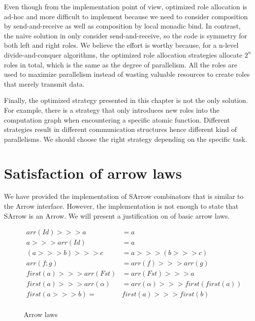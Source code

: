 Even though from the implementation point of view, optimized role allocation is ad-hoc and more difficult to implement because we need to consider composition by send-and-receive as well as composition by local monadic bind. In contrast, the naive solution in  only consider send-and-receive, so the code is symmetry for both left and right roles. We believe the effort is worthy because, for a n-level divide-and-conquer algorithms, the optimized role allocation strategies allocate $2^n$ roles in total, which is the same as the degree of parallelism. All the roles are used to maximize parallelism instead of wasting valuable resources to create roles that merely transmit data.

Finally, the optimized strategy presented in this chapter is not the only solution. For example, there is a strategy that only introduces new roles into the computation graph when encountering a specific atomic function. Different strategies result in different communication structures hence different kind of parallelisms. We should choose the right strategy depending on the specific task.
\section{Satisfaction of arrow laws}
We have provided the implementation of SArrow combinators that is similar to the Arrow interface. However, the implementation is not enough to state that SArrow is an Arrow. We will present a justification on of basic arrow laws.
\begin{figure}[ht]
    \begin{align*}
        arr(Id) >>> a &= a \tag{1}\\
        a >>> arr(Id) &= a \tag{2}\\
        (a >>> b) >>> c &= a >>> (b >>> c) \tag{3}\\
        arr(f;g) &= arr(f) >>> arr(g) \tag{4}\\
        first(a) >>> arr(Fst) &= arr(Fst) >>> a \tag{5}\\
        first(a) >>> arr(\alpha) &= arr(\alpha) >>> first(first(a)) \tag{6}\\
        first(a >>> b) =& first(a) >>> first(b) \tag{7}\\
    \end{align*}
    \caption{Arrow laws \cite{atkeyWhatCategoricalModel2011}}
    \label{arrow:tab:law}
\end{figure}

